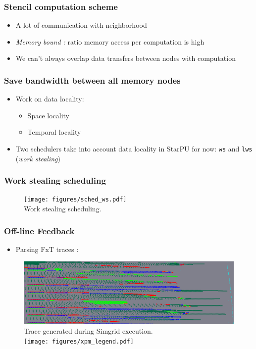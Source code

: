 \documentclass[10pt,a4paper]{beamer}
\begin{document}
\begin{frame}
\frametitle{Stencil computation scheme}
  \begin{itemize}
  \item A lot of communication with neighborhood
  \item \textit{Memory bound :} ratio memory access per computation is high
  \item We can't always overlap data transfers between nodes with computation
  \end{itemize}
\end{frame}

\begin{frame}
\frametitle{Save bandwidth between all memory nodes}
  \begin{itemize}
    \vfill
  \item Work on data locality:
    \begin{itemize}
    \item Space locality
    \item Temporal locality
    \end{itemize}
    \vfill
  \item Two schedulers take into account data locality in StarPU for now: \texttt{ws} and \texttt{lws} (\textit{work stealing})
    \vfill
  \end{itemize}
\end{frame}

\begin{frame}
  \frametitle{Work stealing scheduling}
  \vfill
  \begin{figure}
    \center
    \texttt{[image: figures/sched\_ws.pdf]} \\
    \small{Work stealing scheduling.}
  \end{figure}
  \vfill
\end{frame}

\begin{frame}
\frametitle{Off-line Feedback}
\begin{itemize}
\item Parsing FxT traces :
\end{itemize}
\begin{figure}
  \center
  \includegraphics[width=1\linewidth]{figures/locality_attila_ws.png} \\
  \small{Trace generated during Simgrid execution.} \\
  \vfill
  \texttt{[image: figures/xpm\_legend.pdf]}
  \end{figure}
\end{frame}
\end{document}
